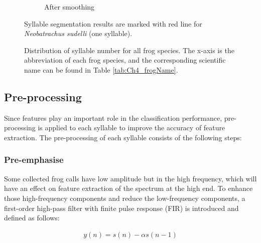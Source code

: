 \begin{figure}[htb!]
\begin{subfigure}[b]{0.6\linewidth}
                \caption{After smoothing}
        \end{subfigure}
        \caption[Syllable segmentation results]{Syllable segmentation results are marked with red
line for \textit{Neobatrachus sudelli} (one syllable).}       
        \label{fig:smooth}
\end{figure}



\begin{figure}[htb!] %
\caption[Distribution of syllable number for all frog species]{Distribution of syllable number for all frog species. The x-axis is the abbreviation of each frog species, and the corresponding scientific name can be found in Table \ref{tab:Ch4_frogName}.}
\label{fig:Ch4_syllable} 
\end{figure}


\subsection{Pre-processing}
Since features play an important role in the classification performance, pre-processing is applied to each syllable to improve the accuracy of feature extraction. The pre-processing of each syllable consists of the following steps:

\subsubsection{Pre-emphasise}
Some collected frog calls have low amplitude but in the high frequency, which will have an effect on feature extraction of the spectrum at the high end. To enhance those high-frequency components and reduce the low-frequency components, a first-order high-pass filter with finite pulse response (FIR) is introduced and defined as follows:

\begin{align}
y(n) = s(n)-\alpha s(n-1)
\end{align}

